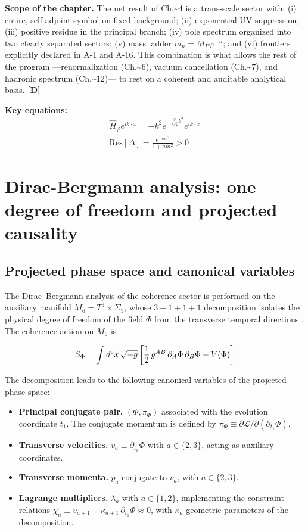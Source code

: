 ﻿\documentclass[11pt,letterpaper]{article}
\begin{document}
\textbf{Scope of the chapter.} The net result of Ch.\textasciitilde{}4 is a trans-scale sector with: (i) entire, self-adjoint symbol on fixed background; (ii) exponential UV suppression; (iii) positive residue in the principal branch; (iv) pole spectrum organized into two clearly separated sectors; (v) mass ladder $m_n = M_P\varphi^{-n}$; and (vi) frontiers explicitly declared in A-1 and A-16. This combination is what allows the rest of the program ---renormalization (Ch.\textasciitilde{}6), vacuum cancellation (Ch.\textasciitilde{}7), and hadronic spectrum (Ch.\textasciitilde{}12)--- to rest on a coherent and auditable analytical basis. \textbf{[D]}

\textbf{Key equations:}
\begin{align*}
    \hat{H}_\varphi e^{ik\cdot x} = -k^2 e^{-\frac{\varphi}{M_P^2}k^2}e^{ik\cdot x} \\
    \mathrm{Res}[\Delta] = \frac{e^{-am^2}}{1+am^2} > 0
\end{align*}
\section{Dirac-Bergmann analysis: one degree of freedom and projected causality}
\subsection{Projected phase space and canonical variables}
The Dirac--Bergmann analysis of the coherence sector is performed on the auxiliary manifold $M_6 = T^3 \times \Sigma_3$, whose $3+1+1+1$ decomposition isolates the physical degree of freedom of the field $\Phi$ from the transverse temporal directions \cite{Dirac1950,Bergmann1949}. The coherence action on $M_6$ is

\begin{equation*}
  \resizebox{\ifdim\width>\linewidth \linewidth\else\width\fi}{!}{$\displaystyle S_\Phi = \int d^6x\,\sqrt{-g}\left[\frac{1}{2}\,g^{AB}\,\partial_A\Phi\,\partial_B\Phi - V(\Phi)\right]$}
\end{equation*}

The decomposition leads to the following canonical variables of the projected phase space:

\begin{itemize}[leftmargin=*]
\item \textbf{Principal conjugate pair.} $(\Phi, \pi_\Phi)$ associated with the evolution coordinate $t_1$. The conjugate momentum is defined by $\pi_\Phi \equiv \partial\mathcal{L}/\partial(\partial_{t_1}\Phi)$.
\item \textbf{Transverse velocities.} $v_a \equiv \partial_{t_a}\Phi$ with $a \in \{2, 3\}$, acting as auxiliary coordinates.
\item \textbf{Transverse momenta.} $p_a$ conjugate to $v_a$, with $a \in \{2, 3\}$.
\item \textbf{Lagrange multipliers.} $\lambda_a$ with $a \in \{1, 2\}$, implementing the constraint relations $\chi_a \equiv v_{a+1} - \kappa_{a+1}\,\partial_{t_1}\Phi \approx 0$, with $\kappa_a$ geometric parameters of the decomposition.
\end{itemize}
\end{document}
